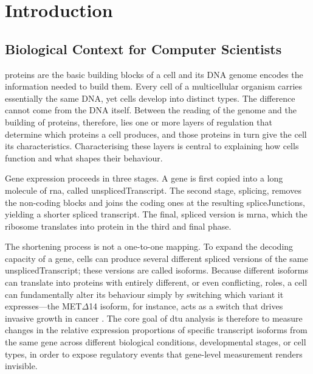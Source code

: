 \chapter{Introduction}

\section{Biological Context for Computer Scientists}
\Glspl{protein} are the basic building blocks of a cell and its DNA \gls{genome} encodes the information needed to build them. Every cell of a multicellular organism carries essentially the same DNA, yet cells develop into distinct types. The difference cannot come from the DNA itself. Between the reading of the genome and the building of proteins, therefore, lies one or more layers of regulation that determine which proteins a cell produces, and those proteins in turn give the cell its characteristics. Characterising these layers is central to explaining how cells function and what shapes their behaviour.

Gene expression proceeds in three stages. A \gls{gene} is first copied into a long molecule of \gls{rna}, called \gls{unsplicedTranscript}. The second stage, \gls{splicing}, removes the non-coding blocks and joins the coding ones at the resulting \glspl{spliceJunction}, yielding a shorter spliced \gls{transcript}. The final, spliced version is \gls{mrna}, which the ribosome translates into protein in the third and final phase.

The shortening process is not a one-to-one mapping. To expand the decoding capacity of a gene, cells can produce several different spliced versions of the same \gls{unsplicedTranscript}; these versions are called \glspl{isoform}. Because different isoforms can translate into proteins with entirely different, or even conflicting, roles, a cell can fundamentally alter its behaviour simply by switching which variant it expresses---the MET$\Delta$14 isoform, for instance, acts as a switch that drives invasive growth in cancer \cite{cerqua2022met}. The core goal of \gls{dtu} analysis is therefore to measure changes in the relative expression proportions of specific transcript isoforms from the same gene across different biological conditions, developmental stages, or cell types, in order to expose regulatory events that gene-level measurement renders invisible.

